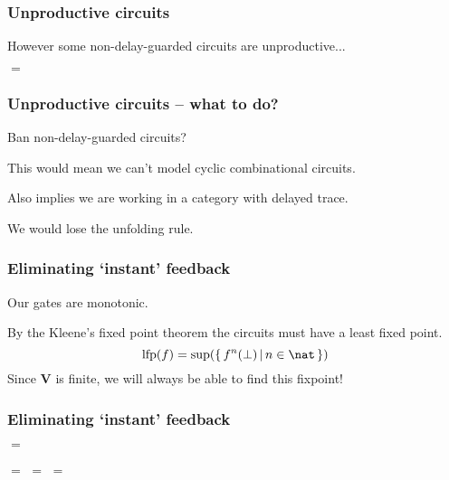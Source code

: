 \begin{frame}
    \frametitle{Unproductive circuits}

    However some non-delay-guarded circuits \alert{are} unproductive...

    \begin{center}
        \pause
        \pause
        \quad$=$\quad

    \end{center}

\end{frame}

\begin{frame}
    \frametitle{Unproductive circuits -- what to do?}

    Ban non-delay-guarded circuits?

    \pause

    This would mean we can't model cyclic combinational circuits.

    \pause

    Also implies we are working in a category with \alert{delayed trace}.
    
    \pause

    We would lose the \alert{unfolding} rule.

\end{frame}

\begin{frame}
    \frametitle{Eliminating `instant' feedback}

    Our gates are \alert{monotonic}.

    By the \alert{Kleene's fixed point theorem} the circuits must have a \alert
    {least fixed point}.
    \[\text{lfp}(f) = \text{sup}(\{\,f^n(\bot) \,|\, n \in \nat\,\})\]
    Since $\textbf{V}$ is finite, we will always be able to find this fixpoint!
\end{frame}

\begin{frame}
    \frametitle{Eliminating `instant' feedback}

    
    \begin{center}
        \pause
        \quad$=$\quad

        \vspace{1em}

        \pause
        \quad$=$\quad
        \pause
        \quad$=$\quad
        \pause
        \quad$=$\quad
    \end{center}


\end{frame}

